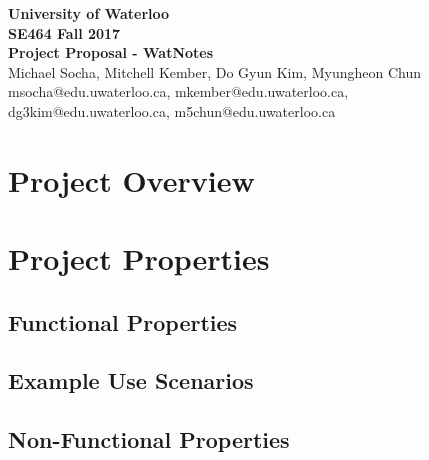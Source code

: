 \documentclass[12pt]{article}
\begin{document}
\begin{center}
\vspace*{\fill}
{\Large\bf University of Waterloo}\\
\vspace{3mm}
{\large\bf SE464 Fall 2017}\\
\vspace{3mm}
{\Large\bf Project Proposal - WatNotes}\\
\vspace{5mm}
Michael Socha, Mitchell Kember, Do Gyun Kim, Myungheon Chun\\
\vspace{3mm}
msocha@edu.uwaterloo.ca, mkember@edu.uwaterloo.ca, dg3kim@edu.uwaterloo.ca, m5chun@edu.uwaterloo.ca\\
\vspace*{\fill}
\end{center}

\newpage

\section{Project Overview}

\newpage

\section{Project Properties}
\subsection{Functional Properties}
\subsection{Example Use Scenarios}
\subsection{Non-Functional Properties}
\end{document}
